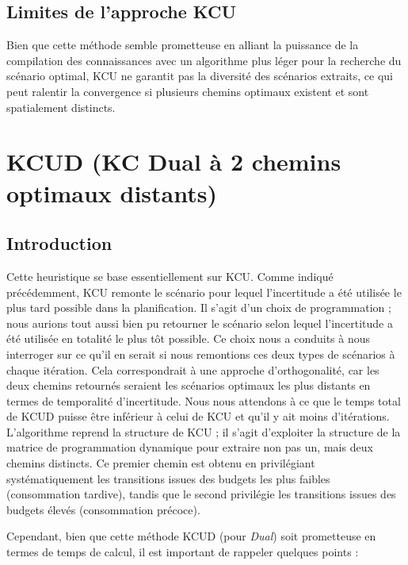 \documentclass[11pt,a4paper]{article}
\begin{document}
\subsection{Limites de l'approche KCU}

Bien que cette méthode semble prometteuse en alliant la puissance de la compilation des connaissances avec un algorithme plus léger pour la recherche du scénario optimal, KCU ne garantit pas la diversité des scénarios extraits, ce qui peut ralentir la convergence si plusieurs chemins optimaux existent et sont spatialement distincts.

\newpage
\section{KCUD (KC Dual à 2 chemins optimaux distants)}
\label{kcud}

\subsection{Introduction}
Cette heuristique se base essentiellement sur KCU. Comme indiqué précédemment, KCU remonte le scénario pour lequel l'incertitude a été utilisée le plus tard possible dans la planification. Il s'agit d'un choix de programmation ; nous aurions tout aussi bien pu retourner le scénario selon lequel l'incertitude a été utilisée en totalité le plus tôt possible. Ce choix nous a conduits à nous interroger sur ce qu'il en serait si nous remontions ces deux types de scénarios à chaque itération. Cela correspondrait à une approche d'orthogonalité, car les deux chemins retournés seraient les scénarios optimaux les plus distants en termes de temporalité d'incertitude. Nous nous attendons à ce que le temps total de KCUD puisse être inférieur à celui de KCU et qu'il y ait moins d'itérations. L'algorithme reprend la structure de KCU ; il s'agit d'exploiter la structure de la matrice de programmation dynamique pour extraire non pas un, mais deux chemins distincts. Ce premier chemin est obtenu en privilégiant systématiquement les transitions issues des budgets les plus faibles (consommation tardive), tandis que le second privilégie les transitions issues des budgets élevés (consommation précoce).

Cependant, bien que cette méthode KCUD (pour \textit{Dual}) soit prometteuse en termes de temps de calcul, il est important de rappeler quelques points :
\end{document}
